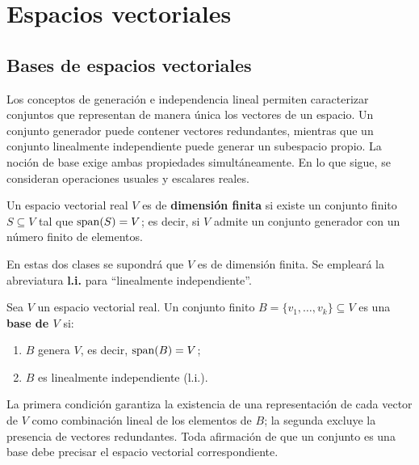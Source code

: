 \documentclass[compacto,10pt]{pubciencias-notas}
\begin{document}
\encabezado
\vspace*{-8mm}
\setcounter{section}{3}
\section{Espacios vectoriales}
\subsection{Bases de espacios vectoriales}

Los conceptos de generación e independencia lineal permiten caracterizar
conjuntos que representan de manera única los vectores de un espacio.
Un conjunto generador puede contener vectores redundantes, mientras que
un conjunto linealmente independiente puede generar un subespacio propio.
La noción de base exige ambas propiedades simultáneamente.
En lo que sigue, se consideran operaciones usuales y escalares reales.

\begin{defi}
    Un espacio vectorial real $V$ es de \textbf{dimensión finita} si
    existe un conjunto finito $S\subseteq V$ tal que $\operatorname{span}(S)=V$;
    es decir, si $V$ admite un conjunto generador con un número finito
    de elementos.
\end{defi}

En estas dos clases se supondrá que $V$ es de dimensión finita.
Se empleará la abreviatura \textbf{l.i.} para ``linealmente independiente''.

\begin{defi}[Base]\label{sem10cl01:base}
    Sea $V$ un espacio vectorial real. Un conjunto finito
    $B=\{v_1,\ldots,v_k\}\subseteq V$ es una \textbf{base de $V$} si:
    \begin{enumerate}
        \item $B$ genera $V$, es decir, $\operatorname{span}(B)=V$;
        \item $B$ es linealmente independiente (l.i.).
    \end{enumerate}
\end{defi}

La primera condición garantiza la existencia de una representación de cada
vector de $V$ como combinación lineal de los elementos de $B$; la segunda
excluye la presencia de vectores redundantes. Toda afirmación de que un
conjunto es una base debe precisar el espacio vectorial correspondiente.
\end{document}
